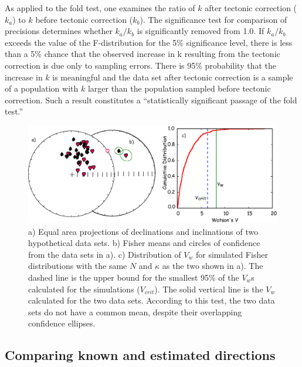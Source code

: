 As applied to the fold test, one examines the ratio of $k$ after tectonic correction ($k_a$) to $k $ before
tectonic correction ($k_b$). The significance test for comparison of precisions determines whether $k_a / k_b$
is significantly removed from 1.0. If $k_a / k_b$ exceeds the value of the F-distribution for the 5\% significance
level, there is less than a 5\% chance that the observed increase in k resulting from the tectonic
correction is due only to sampling errors. There is 95\% probability that the increase in $k$ is meaningful
and the data set after tectonic correction is a sample of a population with $k$ larger than the population
sampled before tectonic correction. Such a result constitutes a ``statistically significant passage of the
fold test.''   









\begin{figure}[h!tb]
\centering  \includegraphics[width= 14 cm]{EPSfiles/twosets.eps}
\caption{a) Equal area projections of declinations and inclinations of  two hypothetical data sets.
b) Fisher means  and circles of confidence from the data sets in a). c) Distribution of $V_w$ for simulated Fisher distributions with the same $N$ and $\kappa$ as the two shown in a).  The dashed line is the upper bound for  the smallest 95\% of the $V_w$s calculated for the simulations ($V_{crit}$).  The solid vertical line is the $V_w$ calculated for the two data sets.  According to this test, the two data sets do not have a common mean, despite their overlapping confidence ellipses.}
\label{fig:twosets}
\end{figure}

\subsection {Comparing known and estimated directions}

